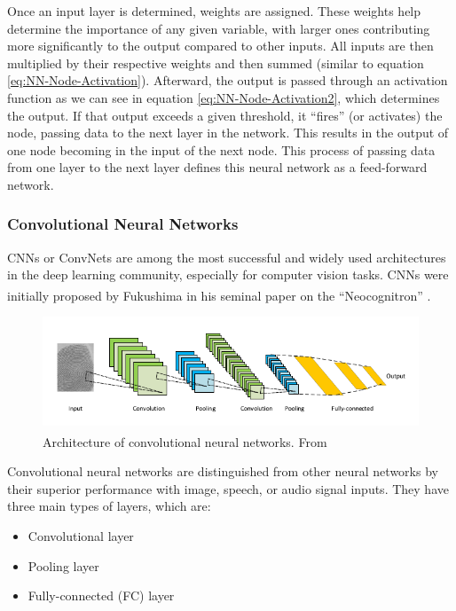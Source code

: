 Once an input layer is determined, weights are assigned. These weights help determine the importance of any given variable, with larger ones contributing more significantly to the output compared to other inputs. All inputs are then multiplied by their respective weights and then summed (similar to equation \ref{eq:NN-Node-Activation}). Afterward, the output is passed through an activation function as we can see in equation \ref{eq:NN-Node-Activation2}, which determines the output. If that output exceeds a given threshold, it “fires” (or activates) the node, passing data to the next layer in the network. This results in the output of one node becoming in the input of the next node. This process of passing data from one layer to the next layer defines this neural network as a feed-forward network.

\subsubsection{Convolutional Neural Networks}
\hspace{\parindent}
CNNs or ConvNets are among the most successful and widely used architectures in the deep learning community, especially for computer vision tasks. CNNs were initially proposed by Fukushima in his seminal paper on the “Neocognitron” \textsuperscript{\cite{fukushima_Neocognitron}}.

\begin{figure}[H]
\centering
\includegraphics[width=\linewidth]{../images/CNN.png}
\caption{Architecture of convolutional neural networks. From \textsuperscript{\cite{minaee2021image}}}
\label{fig:CNN}
\end{figure}

Convolutional neural networks are distinguished from other neural networks by their superior performance with image, speech, or audio signal inputs. They have three main types of layers, which are:

\begin{itemize}
    \item Convolutional layer
    \item Pooling layer
    \item Fully-connected (FC) layer
\end{itemize}

